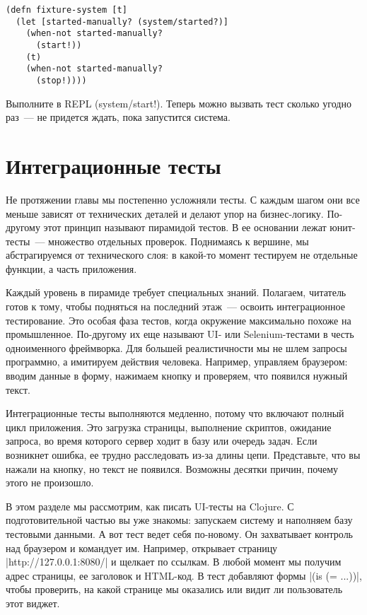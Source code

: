 \begin{verbatim}
(defn fixture-system [t]
  (let [started-manually? (system/started?)]
    (when-not started-manually?
      (start!))
    (t)
    (when-not started-manually?
      (stop!))))
\end{verbatim}

Выполните в REPL (system/start!). Теперь можно вызвать тест сколько угодно раз~---
не придется ждать, пока запустится система.

\section{Интеграционные тесты}

Не протяжении главы мы постепенно усложняли тесты. С каждым шагом они все меньше
зависят от технических деталей и делают упор на бизнес-логику. По-другому этот
принцип называют пирамидой тестов. В ее основании лежат юнит-тесты~--- множество
отдельных проверок. Поднимаясь к вершине, мы абстрагируемся от технического
слоя: в какой-то момент тестируем не отдельные функции, а часть приложения.

Каждый уровень в пирамиде требует специальных знаний. Полагаем, читатель готов к
тому, чтобы подняться на последний этаж~--- освоить интеграционное
тестирование. Это особая фаза тестов, когда окружение максимально похоже на
промышленное. По-другому их еще называют UI- или Selenium-тестами в честь
одноименного фреймворка. Для большей реалистичности мы не шлем запросы
программно, а имитируем действия человека. Например, управляем браузером: вводим
данные в форму, нажимаем кнопку и проверяем, что появился нужный текст.

Интеграционные тесты выполняются медленно, потому что включают полный цикл
приложения. Это загрузка страницы, выполнение скриптов, ожидание запроса, во
время которого сервер ходит в базу или очередь задач. Если возникнет ошибка, ее
трудно расследовать из-за длины цепи. Представьте, что вы нажали на кнопку, но
текст не появился. Возможны десятки причин, почему этого не произошло.

В этом разделе мы рассмотрим, как писать UI-тесты на Clojure. С подготовительной
частью вы уже знакомы: запускаем систему и наполняем базу тестовыми данными. А
вот тест ведет себя по-новому. Он захватывает контроль над браузером и командует
им. Например, открывает страницу \spverb|http://127.0.0.1:8080/| и щелкает по
ссылкам. В любой момент мы получим адрес страницы, ее заголовок и HTML-код. В
тест добавляют формы \spverb|(is (= ...))|, чтобы проверить, на какой странице мы
оказались или видит ли пользователь этот виджет.

